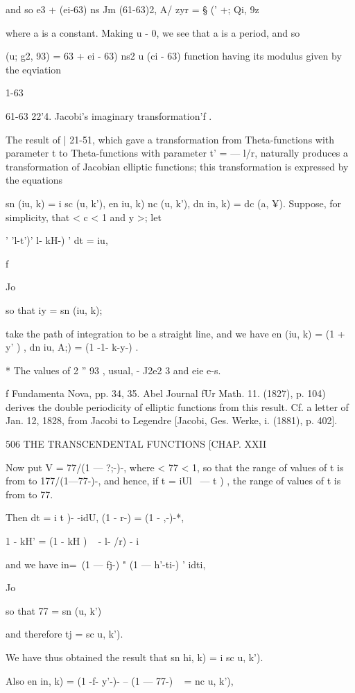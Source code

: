 and so e3 + (ei-63) ns Jm (61-63)2, A/ zyr = § (' +; Qi, 9z\

where a is a constant. Making u - 0, we see that a is a period, and so

  (u; g2, 93) = 63 + ei - 63) ns2 u (ci - 63)%
function having its modulus given by the eqviation

1-63

61-63 22'4. Jacobi's imaginary transformation'f .

The result of | 21-51, which gave a transformation from
Theta-functions with parameter t to Theta-functions with parameter t'
= — l/r, naturally produces a transformation of Jacobian elliptic
functions; this transformation is expressed by the equations

sn (iu, k) = i sc (u, k'), en iu, k) nc (u, k'), dn in, k) = dc (a,
¥). Suppose, for simplicity, that < c < 1 and y >; let

' 'l-t')' l- kH-) ' dt = iu,

f

Jo

so that iy = sn (iu, k);

take the path of integration to be a straight line, and we have en
(iu, k) = (1 + y' ) , dn iu, A;) = (1 -1- k-y-) .

* The values of 2 '' 93 , usual, - J2e2 3 and eie e-s.

f Fundamenta Nova, pp. 34, 35. Abel Journal fUr Math. 11. (1827), p.
104) derives the double periodicity of elliptic functions from this
result. Cf. a letter of Jan. 12, 1828, from Jacobi to Legendre
[Jacobi, Ges. Werke, i. (1881), p. 402].

506 THE TRANSCENDENTAL FUNCTIONS [CHAP. XXII

Now put V = 77/(1 — ?;-)-, where < 77 < 1, so that the range of values
of t is from to 177/(1—77-)-, and hence, if t = iUl \ — t ) , the
range of values of t is from to 77.

Then dt = i t )- -idU, (1 - r-) = (1 - ,-)-*,

1 - kH' = (1 - kH ) ~ - l- /r) - i

and we have in=\ (1 — fj-) " (1 — h'-ti-) ' idti,

Jo

so that 77 = sn (u, k')

and therefore tj = sc u, k').

We have thus obtained the result that sn hi, k) = i sc u, k').

Also en in, k) = (1 -f- y'-)- -- (1 — 77-) ~ = nc u, k'),

